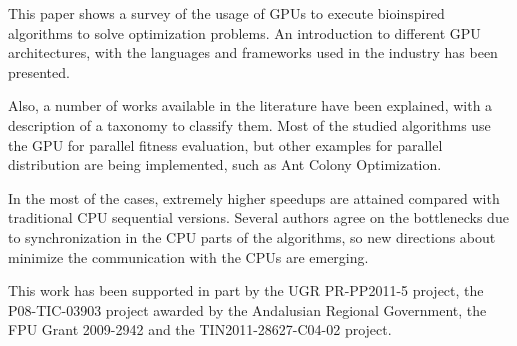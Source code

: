 \documentclass[prodmode,acmtecs]{acmsmall}
\begin{document}
This paper shows a survey of the usage of GPUs to execute bioinspired
algorithms to solve optimization problems. An introduction to different GPU architectures, with the languages and frameworks used in the industry has been presented.

Also, a number of works available in the literature have been explained, with a description of a taxonomy to classify them. Most of the studied algorithms use the GPU for parallel fitness evaluation, but other examples for parallel distribution are being implemented, such as Ant Colony Optimization.

In the most of the cases, extremely higher speedups are attained compared with traditional CPU sequential versions. Several authors agree on the bottlenecks due to synchronization in the CPU parts of the algorithms, so new directions 
about minimize the communication with the CPUs are emerging.


\begin{acks}
This work has been supported in part by 
the UGR PR-PP2011-5 project, 
the P08-TIC-03903 project awarded by the Andalusian Regional Government, 
the FPU Grant 2009-2942 
and 
the TIN2011-28627-C04-02 project.

\end{acks}


 


\bigskip


\end{document}

